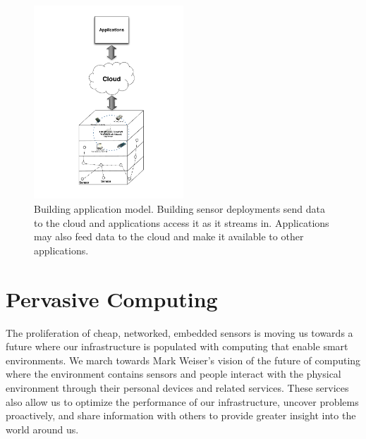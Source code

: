 \begin{figure}[h!]
\begin{center}
\includegraphics[width=0.5\textwidth]{figs/BuildingAppModel}
\caption{Building application model.  Building sensor deployments send data to the cloud and applications access it as it streams in.
Applications may also feed data to the cloud and make it available to other applications.}
\label{fig:buidlingapp}
\end{center}
\end{figure}



\section{Pervasive Computing}
The proliferation of cheap, networked, embedded sensors is moving us towards a future where our infrastructure is 
populated with computing that enable smart environments.  We march towards Mark Weiser's vision of the future of
computing \cite{uqicomp_vision} where the environment contains sensors and people interact with the 
physical environment through their personal devices and related services.  These services also allow us to 
optimize the performance of our infrastructure, uncover problems proactively,
and share information with others to provide greater insight into the world around us.  

